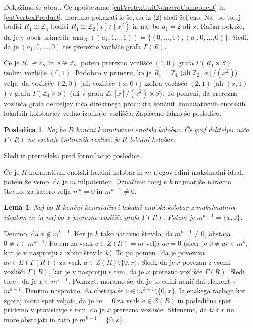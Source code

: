 \documentclass[a4paper, 12pt]{amsart}
\theoremstyle{definition} %
\theoremstyle{plain} %
\newtheorem{lema}[definicija]{Lema}
\newtheorem{posledica}[definicija]{Posledica}
\newcommand{\Z}{\mathbb Z}
\DeclareMathOperator{\ann}{ann}
\begin{document}
Dokažimo še obrat. Če upoštevamo \ref{cutVertexUnitNonzeroComponent} in \ref{cutVertexProduct}, moramo pokazati le še, da iz (2) sledi željeno. Naj bo torej bodisi $R_1\cong \Z_4$ bodisi $R_1 \cong \Z_2[x]/(x^2)$ in naj bo $a_1 = 2$ ali $x$. Račun pokaže, da je v obeh primerih $ \ann_R((a_1,1\dots,1)) = \{(0,\dots,0),(a_1,0,\dots,0)\}$. Sledi, da je $(a_1,0,\dots,0)$ res prerezno vozlišče grafa $\Gamma(R)$.
\endproof

Če je $R_1\cong \Z_2$ in $S\not\cong \Z_2$, potem prerezno vozlišče $(1,0)$ grafa $\Gamma(R_1\times S) $ izolira vozlišče $(0,1)$. Podobno v primeru, ko je $R_1 = \Z_4$ (ali $\Z_2[x]/(x^2)$) velja, da vozlišče $(2,0)$ (ali vozlišče $(x,0)$) izolira vozlišče $(2,1)$ (ali $(x,1)$) v grafu $\Gamma(\Z_4 \times S)$ (ali v grafu $\Z_2[x]/(x^2) \times S$). To pomeni, da prerezna vozlišča grafa deliteljev niča direktnega produkta končnih komutativnih enotskih lokalnih kolobarjev vedno izolirajo vozlišča. Zapišemo lahko še posledico.

\begin{posledica}
Naj bo $R$ končni komutativni enotski kolobar. Če graf deliteljev niča $\Gamma(R)$ ne vsebuje izoliranih vozlišč, je $R$ lokalni kolobar.
\end{posledica}

\proof
Sledi iz premisleka pred formulacijo posledice.
\endproof

Če je $R$ komutativni enotski lokalni kolobar in $m$ njegov edini maksimalni ideal, potem že vemo, da je $m$ nilpotenten. Označimo torej s $k$ najmanjše naravno število, za katero velja $m^k = 0$ in $m^{k-1}\neq 0$.

\begin{lema}
\label{localRingCutVertex}
Naj bo $R$ končni komutativni lokalni enotski kolobar z maksimalnim idealom $m$ in naj bo $x$ prerezno vozlišče grafa $\Gamma(R)$. Potem je $m^{k-1} = \{x,0\}$.
\end{lema}

\proof
Denimo, da $x\notin m^{k-1}$. Ker je $k$ tako naravno število, da $m^{k-1} \neq 0$, obstaja $0\neq r \in m^{k-1}$. Potem za vsak $a\in Z(R)=m$ velja $ar = 0 $ (sicer je $0\neq ar \in m^k$, kar je v nasprotju z izbiro števila $k$). To pa pomeni, da je povezava $ar \in E(\Gamma(R))$ za vsak $a\in Z(R)\setminus \{0,r\}$. Sledi, da je $r$ povezan z vsemi vozlišči $\Gamma(R)$, kar je v nasprotju s tem, da je $x$ prerezno vozlišče $\Gamma(R)$. Sledi torej, da je $x\in m^{k-1}$. Pokazati moramo še, da je to edini neničelni element v $m^{k-1}$. Denimo nasprotno, da obstaja še $r\in m^{k-1} \setminus \{0,x\}$. Iz enakega razloga kot zgoraj mora spet veljati, da je $ra = 0$ za vsak $a\in Z(R)$ in posledično spet pridemo v protislovje s tem, da je $x$ prerezno vozlišče. Sklenemo, da tak $r$ ne more obstajati in zato je $m^{k-1} = \{0,x\}$.
\endproof
\end{document}
